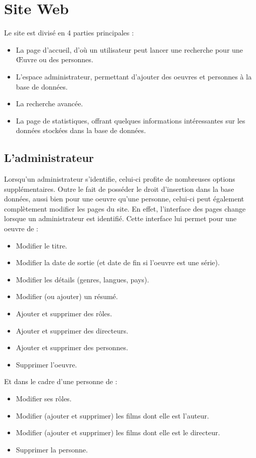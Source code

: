\documentclass[10pt,a4paper]{article}
\begin{document}
\newpage
\section{Site Web}

Le site est divisé en 4 parties principales : 
\vskip 3pt
\begin{itemize}
\item La page d’accueil, d'où un utilisateur peut lancer une recherche pour une Œuvre ou des personnes.
\item L'espace administrateur, permettant d'ajouter des oeuvres et personnes à la base de données.
\item La recherche avancée.
\item La page de statistiques, offrant quelques informations intéressantes sur les données stockées dans la base de données.
\end{itemize}

\subsection{L'administrateur}
Lorsqu'un administrateur s'identifie, celui-ci profite de nombreuses options supplémentaires. Outre le fait de posséder le droit d'insertion dans la base données, aussi bien pour une oeuvre qu'une personne, celui-ci peut également complètement modifier les pages du site. En effet, l'interface des pages change lorsque un administrateur est identifié. Cette interface lui permet pour une oeuvre de :
\vskip 3pt
\begin{itemize}
\item Modifier le titre.
\item Modifier la date de sortie (et date de fin si l'oeuvre est une série).
\item Modifier les détails (genres, langues, pays).
\item Modifier (ou ajouter) un résumé.
\item Ajouter et supprimer des rôles.
\item Ajouter et supprimer des directeurs.
\item Ajouter et supprimer des personnes.
\item Supprimer l'oeuvre.
\end{itemize}

\vskip 10pt
Et dans le cadre d'une personne de :
\begin{itemize}
\item Modifier ses rôles.
\item Modifier (ajouter et supprimer) les films dont elle est l’auteur.
\item Modifier (ajouter et supprimer) les films dont elle est le directeur.
\item Supprimer la personne.
\end{itemize}
\end{document}

